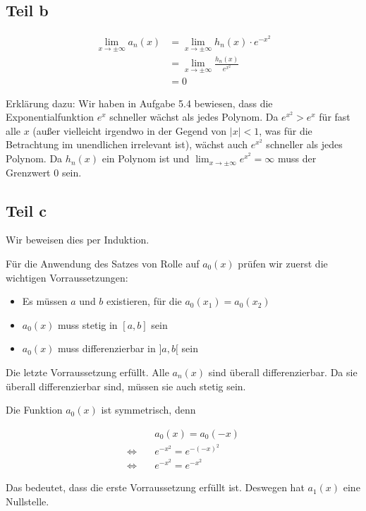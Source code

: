 \documentclass[a4paper,german,12pt,smallheadings]{scrartcl}
\begin{document}
\subsection*{Teil b}

\begin{align*}
  \lim_{x \to \pm \infty} a_n(x) &= \lim_{x \to \pm \infty} h_n(x) \cdot e^{-x^2} \\
  &= \lim_{x \to \pm \infty} \frac{h_n(x)}{e^{x^2}} \\
  &= 0
\end{align*}

Erklärung dazu: Wir haben in Aufgabe 5.4 bewiesen, dass die Exponentialfunktion
$e^x$ schneller wächst als jedes Polynom. Da $e^{x^2} > e^x$ für fast alle $x$
(außer vielleicht irgendwo in der Gegend von $|x| < 1$, was für die Betrachtung
im unendlichen irrelevant ist), wächst auch $e^{x^2}$ schneller als jedes
Polynom. Da $h_n(x)$ ein Polynom ist und $\lim_{x \to \pm \infty} e^{x^2} =
\infty$ muss der Grenzwert 0 sein.

\subsection*{Teil c}

Wir beweisen dies per Induktion.

Für die Anwendung des Satzes von Rolle auf $a_0(x)$ prüfen wir zuerst die wichtigen Vorraussetzungen:

\begin{itemize}
  \item Es müssen $a$ und $b$ existieren, für die $a_0(x_1) = a_0(x_2)$
  \item $a_0(x)$ muss stetig in $[a,b]$ sein
  \item $a_0(x)$ muss differenzierbar in $]a,b[$ sein
\end{itemize}

Die letzte Vorraussetzung erfüllt. Alle $a_n(x)$ sind überall differenzierbar.
Da sie überall differenzierbar sind, müssen sie auch stetig sein.

Die Funktion $a_0(x)$ ist symmetrisch, denn

\begin{align*}
  &a_0(x) = a_0(-x) \\
  \Leftrightarrow\quad &e^{-x^2} = e^{-(-x)^2} \\
  \Leftrightarrow\quad &e^{-x^2} = e^{-x^2}
\end{align*}

Das bedeutet, dass die erste Vorraussetzung erfüllt ist. Deswegen hat $a_1(x)$ eine Nullstelle.
\end{document}
